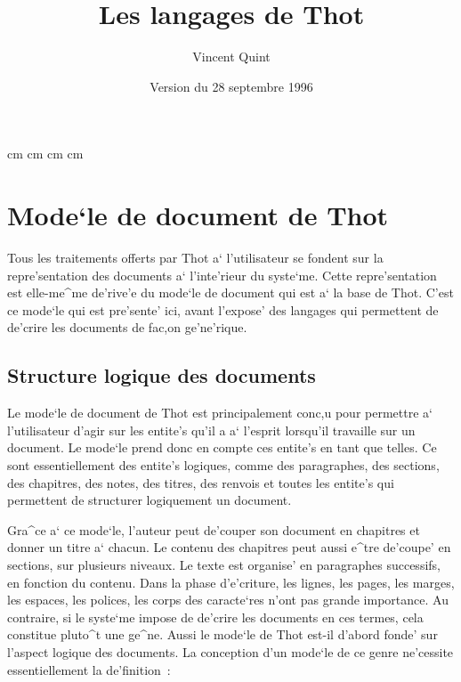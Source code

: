 
\marginparwidth 0pt
 cm
 cm
\marginparsep 0pt
\topmargin   0pt
 cm
 cm

\newenvironment{example}{\begin{quotation}\noindent{\bf Exemple~:}}{\end{quotation}}


\sloppy

\title{\Huge Les langages de Thot}
\author{Vincent Quint}
\date{Version du 28 septembre 1996}
\maketitle

\chapter{Mode`le de document de Thot}

Tous les traitements offerts par Thot a` l'utilisateur se fondent sur la
repre'sentation des documents a` l'inte'rieur du syste`me. Cette repre'sentation
est elle-me^me de'rive'e du mode`le de document qui est a` la base de Thot.
C'est ce mode`le qui est pre'sente' ici, avant l'expose' des langages qui
permettent de de'crire les documents de fac,on ge'ne'rique.

\section{Structure logique des documents}

Le mode`le de document de Thot est principalement conc,u pour permettre a`
l'utilisateur d'agir sur les entite's qu'il a a` l'esprit lorsqu'il travaille
sur un document. Le mode`le prend donc en compte ces entite's en tant que
telles. Ce sont essentiellement des entite's logiques, comme des paragraphes,
des sections, des chapitres, des notes, des titres, des renvois et toutes les
entite's qui permettent de structurer logiquement un document.

Gra^ce a` ce mode`le, l'auteur peut de'couper son document en chapitres et
donner un titre a` chacun. Le contenu des chapitres peut aussi e^tre de'coupe'
en sections, sur plusieurs niveaux. Le texte est organise' en paragraphes
successifs, en fonction du contenu. Dans la phase d'e'criture, les
lignes, les pages, les marges, les espaces, les polices, les corps des
caracte`res n'ont pas grande importance. Au contraire, si le syste`me impose
de de'crire les documents en ces termes, cela constitue pluto^t une ge^ne.
Aussi le mode`le de Thot est-il d'abord fonde' sur l'aspect logique des
documents. La conception d'un mode`le de ce genre ne'cessite essentiellement
la de'finition~:

